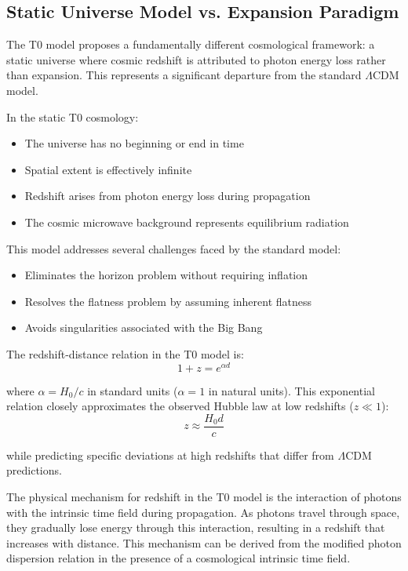 \documentclass[12pt,a4paper]{article} %
\begin{document}
\subsection{Static Universe Model vs. Expansion Paradigm}
\label{subsec:static_universe}

The T0 model proposes a fundamentally different cosmological framework:
a static universe where cosmic redshift is attributed to photon energy loss
rather than expansion. 
This represents a significant departure from the standard $\Lambda$CDM model.

In the static T0 cosmology:
\begin{itemize}
	\item The universe has no beginning or end in time
	\item Spatial extent is effectively infinite
	\item Redshift arises from photon energy loss during propagation
	\item The cosmic microwave background represents equilibrium radiation
\end{itemize}

This model addresses several challenges faced by the standard model:
\begin{itemize}
	\item Eliminates the horizon problem without requiring inflation
	\item Resolves the flatness problem by assuming inherent flatness
	\item Avoids singularities associated with the Big Bang
\end{itemize}

The redshift-distance relation in the T0 model is:
\begin{equation}
	1 + z = e^{\alpha d}
	\label{eq:redshift_distance}
\end{equation}

where $\alpha = H_0/c$ in standard units ($\alpha = 1$ in natural units). 
This exponential relation closely approximates the observed Hubble law
at low redshifts ($z \ll 1$):
\begin{equation}
	z \approx \frac{H_0 d}{c}
	\label{eq:hubble_law}
\end{equation}

while predicting specific deviations at high redshifts
that differ from $\Lambda$CDM predictions.

The physical mechanism for redshift in the T0 model
is the interaction of photons with the intrinsic time field during propagation. 
As photons travel through space,
they gradually lose energy through this interaction,
resulting in a redshift that increases with distance. 
This mechanism can be derived from the modified photon dispersion relation
in the presence of a cosmological intrinsic time field.
\end{document}
